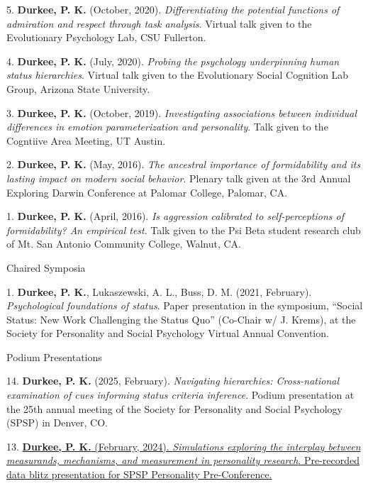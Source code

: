 \documentclass[10pt,]{article}
\begin{document}
5. \hangindent=0.5in \textbf{Durkee, P. K.} (October, 2020).
\emph{Differentiating the potential functions of admiration and respect
through task analysis}. Virtual talk given to the Evolutionary
Psychology Lab, CSU Fullerton.

4. \hangindent=0.5in \textbf{Durkee, P. K.} (July, 2020). \emph{Probing
the psychology underpinning human status hierarchies}. Virtual talk
given to the Evolutionary Social Cognition Lab Group, Arizona State
University.

3. \hangindent=0.5in \textbf{Durkee, P. K.} (October, 2019).
\emph{Investigating associations between individual differences in
emotion parameterization and personality}. Talk given to the Cogntiive
Area Meeting, UT Austin.

2. \hangindent=0.5in \textbf{Durkee, P. K.} (May, 2016). \emph{The
ancestral importance of formidability and its lasting impact on modern
social behavior}. Plenary talk given at the 3rd Annual Exploring Darwin
Conference at Palomar College, Palomar, CA.

1. \hangindent=0.5in \textbf{Durkee, P. K.} (April, 2016). \emph{Is
aggression calibrated to self-perceptions of formidability? An empirical
test}. Talk given to the Psi Beta student research club of Mt. San
Antonio Community College, Walnut, CA.

\textcolor{light-gray}{Chaired Symposia}

1. \hangindent=0.5in \textbf{Durkee, P. K.}, Lukaszewski, A. L., Buss,
D. M. (2021, February). \emph{Psychological foundations of status}.
Paper presentation in the symposium, ``Social Status: New Work
Challenging the Status Quo'' (Co-Chair w/ J. Krems), at the Society for
Personality and Social Psychology Virtual Annual Convention.

\textcolor{light-gray}{Podium Presentations}

14. \hangindent=0.5in \textbf{Durkee, P. K.} (2025, February).
\emph{Navigating hierarchies: Cross-national examination of cues
informing status criteria inference}. Podium presentation at the 25th
annual meeting of the Society for Personality and Social Psychology
(SPSP) in Denver, CO.

13. \hangindent=0.5in
\href{https://www.youtube.com/watch?v=CLGuF_fBM0o&list=PL6Fi8qOQlSrj7v5Kj7C_aekqXco9Cnljk&index=9}{\textbf{Durkee,
P. K.} (February, 2024). \emph{Simulations exploring the interplay
between measurands, mechanisms, and measurement in personality
research}. Pre-recorded data blitz presentation for SPSP Personality
Pre-Conference. \faPlay}
\end{document}
